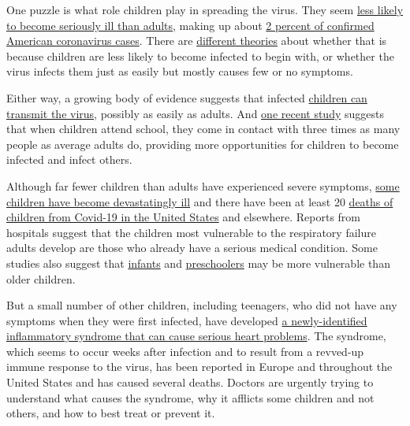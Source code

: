One puzzle is what role children play in spreading the virus. They seem
\href{https://www.nytimes3xbfgragh.onion/2020/04/06/health/coronavirus-children-us.html}{less
likely to become seriously ill than adults}, making up about
\href{https://www.cdc.gov/coronavirus/2019-ncov/hcp/pediatric-hcp.html}{2
percent of confirmed American coronavirus cases}. There are
\href{https://www.nature.com/articles/d41586-020-01354-0}{different
theories} about whether that is because children are less likely to
become infected to begin with, or whether the virus infects them just as
easily but mostly causes few or no symptoms.

Either way, a growing body of evidence suggests that infected
\href{https://www.nytimes3xbfgragh.onion/2020/05/05/health/coronavirus-children-transmission-school.html}{children
can transmit the virus}, possibly as easily as adults. And
\href{https://science.sciencemag.org/content/early/2020/05/04/science.abb8001.full}{one
recent study} suggests that when children attend school, they come in
contact with three times as many people as average adults do, providing
more opportunities for children to become infected and infect others.

Although far fewer children than adults have experienced severe
symptoms,
\href{https://www.nytimes3xbfgragh.onion/2020/05/11/health/coronavirus-children-icu.html}{some
children have become devastatingly ill} and there have been at least 20
\href{https://data.cdc.gov/NCHS/Provisional-COVID-19-Death-Counts-by-Sex-Age-and-S/9bhg-hcku}{deaths
of children from Covid-19 in the United States} and elsewhere. Reports
from hospitals suggest that the children most vulnerable to the
respiratory failure adults develop are those who already have a serious
medical condition. Some studies also suggest that
\href{https://www.nytimes3xbfgragh.onion/2020/04/06/health/coronavirus-children-us.html}{infants}
and
\href{https://www.nytimes3xbfgragh.onion/2020/03/17/health/coronavirus-childen.html}{preschoolers}
may be more vulnerable than older children.

But a small number of other children, including teenagers, who did not
have any symptoms when they were first infected, have developed
\href{https://www.nytimes3xbfgragh.onion/2020/05/17/health/coronavirus-multisystem-fnflammatory-syndrome-children-teenagers.html\#commentsContainer}{a
newly-identified inflammatory syndrome that can cause serious heart
problems}. The syndrome, which seems to occur weeks after infection and
to result from a revved-up immune response to the virus, has been
reported in Europe and throughout the United States and has caused
several deaths. Doctors are urgently trying to understand what causes
the syndrome, why it afflicts some children and not others, and how to
best treat or prevent it.

